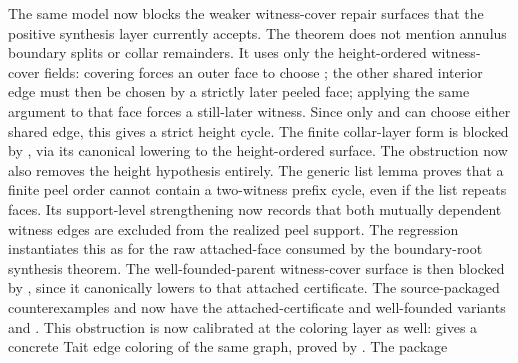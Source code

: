 \documentclass[11pt]{article}
\begin{document}
The same model now blocks the weaker witness-cover repair surfaces that the
positive synthesis layer currently accepts.  The theorem
does not mention annulus boundary splits or collar remainders.  It uses only the
height-ordered witness-cover fields: covering  forces an outer face
to choose ; the other shared interior edge  must then be
chosen by a strictly later peeled face; applying the same argument to that face
forces a still-later  witness.  Since only  and
 can choose either shared edge, this gives a strict height cycle.
The finite collar-layer form is blocked by
,
via its canonical lowering to the height-ordered surface.  The obstruction now
also removes the height hypothesis entirely.  The generic list lemma
 proves that a finite peel order
cannot contain a two-witness prefix cycle, even if the list repeats faces.  Its
support-level strengthening
 now records
that both mutually dependent witness edges are excluded from the realized peel
support.  The regression instantiates this as
for the raw attached-face  consumed by
the boundary-root synthesis theorem.  The well-founded-parent witness-cover
surface is then blocked by
,
since it canonically lowers to that attached certificate.  The source-packaged
counterexamples
and
now have the attached-certificate and well-founded variants
and
.
This obstruction is now calibrated at the coloring layer as well:
 gives a concrete Tait edge coloring
of the same graph, proved by
.  The package
\end{document}

